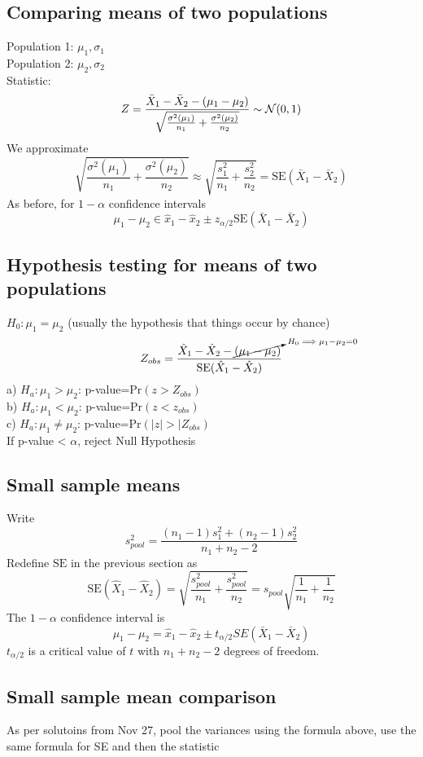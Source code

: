 \documentclass{article}
\newcommand{\beq}{\begin{equation}}
\newcommand{\eeq}{\end{equation}}
\begin{document}
\subsection{Comparing means of two populations}
Population 1: $\mu_1,\sigma_1$\\
Population 2: $\mu_2,\sigma_2$\\
Statistic:
\beq
Z = \frac{\bar{X}_1-\bar{X}_2 - (\mu_1-\mu_2)}{\sqrt{\frac{\sigma^2(\mu_1)}{n_1}+\frac{\sigma^2(\mu_2)}{n_2}}} \sim \mathcal{N}(0,1) \\
\eeq
We approximate
\beq
\sqrt{\frac{\sigma^2(\mu_1)}{n_1}+\frac{\sigma^2(\mu_2)}{n_2}} \approx \sqrt{\frac{s_1^2}{n_1}+\frac{s_2^2}{n_2}} = \text{SE}(\bar{X}_1-\bar{X}_2)
\eeq
As before, for $1-\alpha$ confidence intervals
\beq
\mu_1 - \mu_2 \in \hat{x}_1 - \hat{x}_2 \pm z_{\alpha/2}\text{SE}(\bar{X}_1-\bar{X}_2)
\eeq
\subsection{Hypothesis testing for means of two populations}
$H_0:\mu_1 = \mu_2$ (usually the hypothesis that things occur by chance)
\beq
Z_{obs} = \frac{\hat{X}_1-\hat{X}_2-\cancelto{H_0 \implies \mu_1-\mu_2=0}{(\mu_1-\mu_2)}}{\text{SE}(\hat{X}_1-\hat{X}_2)}
\eeq
a) $H_a: \mu_1 > \mu_2$: p-value=Pr$(z>Z_{obs})$\\
b) $H_a: \mu_1 < \mu_2$: p-value=Pr$(z<z_{obs})$\\
c) $H_a:\mu_1\ne\mu_2$: p-value=Pr$(|z|>|Z_{obs})$\\
If p-value < $\alpha$, reject Null Hypothesis
\subsection{Small sample means}
Write
\beq
s^2_{pool} = \frac{ (n_1-1)s^2_1 + (n_2-1)s^2_2}{n_1 + n_2 - 2}
\eeq
Redefine $\text{SE}$ in the previous section as
\beq
\text{SE}(\hat{X}_1- \hat{X}_2) = \sqrt{\frac{s^2_{pool}}{n_1} + \frac{s^2_{pool}}{n_2}} = s_{pool}\sqrt{\frac{1}{n_1} + \frac{1}{n_2}}
\eeq
The $1-\alpha$ confidence interval is
\beq
\mu_1 - \mu_2 = \hat{x}_1 - \hat{x}_2 \pm t_{\alpha/2}SE(\bar{X}_1-\bar{X}_2)
\eeq
$t_{\alpha/2}$ is a critical value of $t$ with $n_1+n_2-2$ degrees of freedom.
\subsection{Small sample mean comparison}
As per solutoins from Nov 27, pool the variances using the formula above, use the same formula for SE and then the statistic
\end{document}
